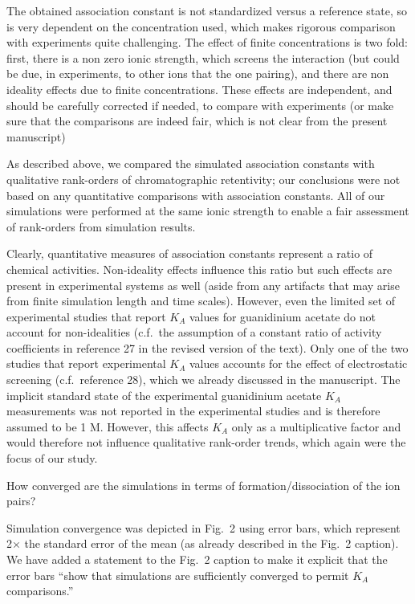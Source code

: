 \documentclass[answers,12pt]{exam}
\begin{document}
\begin{questions}
    \question The obtained association constant is not standardized versus a reference state, so is very dependent on the concentration used, which makes rigorous comparison with experiments quite challenging. The effect of finite concentrations is two fold: first, there is a non zero ionic strength, which screens the interaction (but could be due, in experiments, to other ions that the one pairing), and there are non ideality effects due to finite concentrations. These effects are independent, and should be carefully corrected if needed, to compare with experiments (or make sure that the comparisons are indeed fair, which is not clear from the present manuscript) 
    \begin{solution}
    As described above, we compared the simulated association constants with qualitative rank-orders of chromatographic retentivity; our conclusions were not based on any quantitative comparisons with association constants. All of our simulations were performed at the same ionic strength to enable a fair assessment of rank-orders from simulation results.
    
    Clearly, quantitative measures of association constants represent a ratio of chemical activities. Non-ideality effects influence this ratio but such effects are present in experimental systems as well (aside from any artifacts that may arise from finite simulation length and time scales). However, even the limited set of experimental studies that report $K_A$ values for guanidinium acetate do not account for non-idealities (c.f.~the assumption of a constant ratio of activity coefficients in reference 27 in the revised version of the text). Only one of the two studies that report experimental $K_A$ values accounts for the effect of electrostatic screening (c.f.~reference 28), which we already discussed in the manuscript. The implicit standard state of the experimental guanidinium acetate $K_A$ measurements was not reported in the experimental studies and is therefore assumed to be 1 M. However, this affects $K_A$ only as a multiplicative factor and would therefore not influence qualitative rank-order trends, which again were the focus of our study. 
    
    \end{solution}
 
    \question How converged are the simulations in terms of formation/dissociation of the ion pairs?
    \begin{solution}
    Simulation convergence was depicted in Fig.~2 using error bars, which represent 2× the standard error of the mean (as already described in the Fig.~2 caption). We have added a statement to the Fig.~2 caption to make it explicit that the error bars ``show that simulations are sufficiently converged to permit $K_A$ comparisons.''


\end{solution}
\end{questions}
\end{document}
